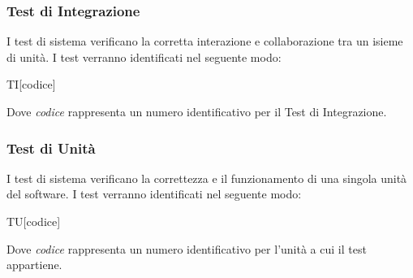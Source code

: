 \documentclass[../piano-di-qualifica.tex]{subfiles}
\begin{document}
  \subsubsection{Test di Integrazione}
  \label{subs:integrazione}
    I test di sistema verificano la corretta interazione e collaborazione tra un isieme di unità. I test verranno identificati nel seguente modo:
    \begin{center}
      TI[codice]
    \end{center}
    Dove \textit{codice} rappresenta un numero identificativo per il Test di Integrazione.
  \subsubsection{Test di Unità}%
  \label{subs:unita}
    I test di sistema verificano la correttezza e il funzionamento di una singola unità del software. I test verranno identificati nel seguente modo:
    \begin{center}
      TU[codice]
    \end{center}
    Dove \textit{codice} rappresenta un numero identificativo per l'unità a cui il test appartiene.
\end{document}
